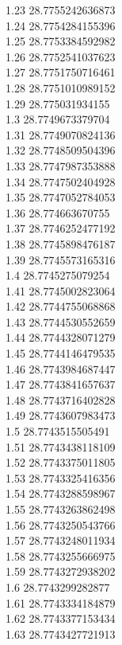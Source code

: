 {1.23	28.7755242636873\\
1.24	28.7754284155396\\
1.25	28.7753384592982\\
1.26	28.7752541037623\\
1.27	28.7751750716461\\
1.28	28.7751010989152\\
1.29	28.775031934155\\
1.3	28.7749673379704\\
1.31	28.7749070824136\\
1.32	28.7748509504396\\
1.33	28.7747987353888\\
1.34	28.7747502404928\\
1.35	28.7747052784053\\
1.36	28.774663670755\\
1.37	28.7746252477192\\
1.38	28.7745898476187\\
1.39	28.7745573165316\\
1.4	28.7745275079254\\
1.41	28.7745002823064\\
1.42	28.7744755068868\\
1.43	28.7744530552659\\
1.44	28.7744328071279\\
1.45	28.7744146479535\\
1.46	28.7743984687447\\
1.47	28.7743841657637\\
1.48	28.7743716402828\\
1.49	28.7743607983473\\
1.5	28.7743515505491\\
1.51	28.7743438118109\\
1.52	28.7743375011805\\
1.53	28.7743325416356\\
1.54	28.7743288598967\\
1.55	28.7743263862498\\
1.56	28.7743250543766\\
1.57	28.7743248011934\\
1.58	28.7743255666975\\
1.59	28.7743272938202\\
1.6	28.7743299282877\\
1.61	28.7743334184879\\
1.62	28.7743377153434\\
1.63	28.7743427721913\\
}

